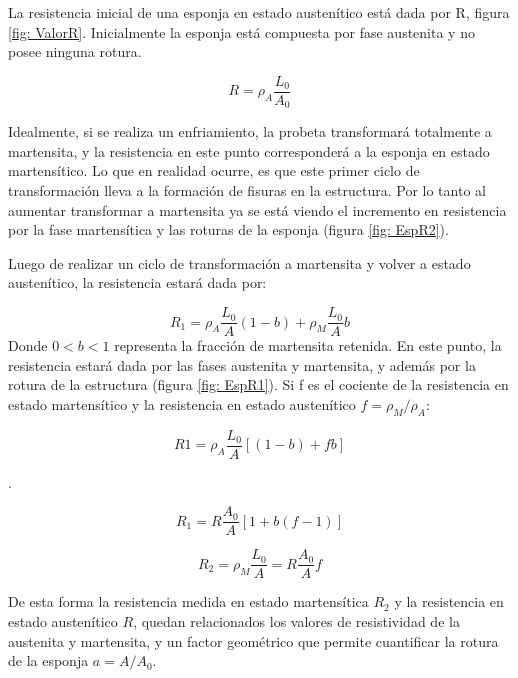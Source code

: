 \documentclass[a4paper,12pt,fleqn,twoside,openany]{book}
\begin{document}
La resistencia inicial de una esponja en estado austenítico está dada por R, figura \ref{fig: ValorR}. Inicialmente la esponja está compuesta por fase austenita y no posee ninguna rotura.

\begin{equation}
 R=\rho_A \frac{L_0}{A_0}
\end{equation}

Idealmente, si se realiza un enfriamiento, la probeta transformará totalmente a martensita, y la resistencia en este punto corresponderá a la esponja en estado martensítico. Lo que en realidad ocurre, es que este primer ciclo de transformación lleva a la formación de fisuras en la estructura. Por lo tanto al aumentar transformar a martensita ya se está viendo el incremento en resistencia por la fase martensítica y las roturas de la esponja (figura \ref{fig: EspR2}). 


Luego de realizar un ciclo de transformación a martensita y volver a estado austenítico, la resistencia estará dada por:

\begin{equation}
 R_1=\rho_A \frac{L_0}{A}(1-b) + \rho_M \frac{L_0}{A}b
\end{equation}
Donde $0<b<1$ representa la fracción de martensita retenida. En este punto, la resistencia estará dada por las fases austenita y martensita, y además por la rotura de la estructura (figura \ref{fig: EspR1}). Si f es el cociente de la resistencia en estado martensítico y la resistencia en estado austenítico $f=\rho_M / \rho_ A$: 

\begin{equation}
R1= \rho_A \frac{L_0}{A} [(1-b)+fb]
\end{equation}

.

\begin{equation}
 R_1=R \frac{A_0}{A}[1+b(f-1)]
\end{equation}

\begin{equation}
 R_2 = \rho_M \frac{L_0}{A} = R \frac{A_0}{A} f
\end{equation}

De esta forma la resistencia medida en estado martensítica $R_2$ y la resistencia en estado austenítico $R$, quedan relacionados los valores de resistividad de la austenita y martensita, y un factor geométrico que permite cuantificar la rotura de la esponja $a=A/A_0$.
\end{document}
